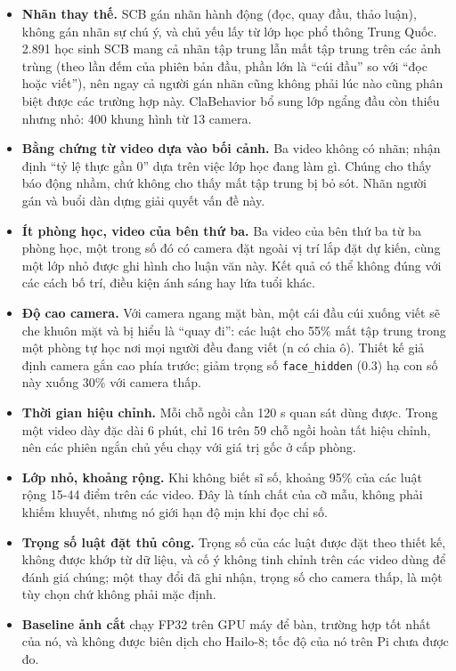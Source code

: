 \begin{itemize}
\tightlist
\item
  \textbf{Nhãn thay thế.} SCB gán nhãn hành động (đọc, quay đầu, thảo luận), không gán nhãn sự chú ý, và chủ yếu lấy từ lớp học phổ thông Trung Quốc. 2.891 học sinh SCB mang cả nhãn tập trung lẫn mất tập trung trên các ảnh trùng (theo lần đếm của phiên bản đầu, phần lớn là ``cúi đầu'' so với ``đọc hoặc viết''), nên ngay cả người gán nhãn cũng không phải lúc nào cũng phân biệt được các trường hợp này. ClaBehavior bổ sung lớp ngẩng đầu còn thiếu nhưng nhỏ: 400 khung hình từ 13 camera.
\item
  \textbf{Bằng chứng từ video dựa vào bối cảnh.} Ba video không có nhãn; nhận định ``tỷ lệ thực gần 0'' dựa trên việc lớp học đang làm gì. Chúng cho thấy báo động nhầm, chứ không cho thấy mất tập trung bị bỏ sót. Nhãn người gán và buổi dàn dựng giải quyết vấn đề này.
\item
  \textbf{Ít phòng học, video của bên thứ ba.} Ba video của bên thứ ba từ ba phòng học, một trong số đó có camera đặt ngoài vị trí lắp đặt dự kiến, cùng một lớp nhỏ được ghi hình cho luận văn này. Kết quả có thể không đúng với các cách bố trí, điều kiện ánh sáng hay lứa tuổi khác.
\item
  \textbf{Độ cao camera.} Với camera ngang mặt bàn, một cái đầu cúi xuống viết sẽ che khuôn mặt và bị hiểu là ``quay đi'': các luật cho 55\% mất tập trung trong một phòng tự học nơi mọi người đều đang viết (n có chia ô). Thiết kế giả định camera gắn cao phía trước; giảm trọng số \texttt{face\_hidden} (0.3) hạ con số này xuống 30\% với camera thấp.
\item
  \textbf{Thời gian hiệu chỉnh.} Mỗi chỗ ngồi cần 120 s quan sát dùng được. Trong một video dày đặc dài 6 phút, chỉ 16 trên 59 chỗ ngồi hoàn tất hiệu chỉnh, nên các phiên ngắn chủ yếu chạy với giá trị gốc ở cấp phòng.
\item
  \textbf{Lớp nhỏ, khoảng rộng.} Khi không biết sĩ số, khoảng 95\% của các luật rộng 15-44 điểm trên các video. Đây là tính chất của cỡ mẫu, không phải khiếm khuyết, nhưng nó giới hạn độ mịn khi đọc chỉ số.
\item
  \textbf{Trọng số luật đặt thủ công.} Trọng số của các luật được đặt theo thiết kế, không được khớp từ dữ liệu, và cố ý không tinh chỉnh trên các video dùng để đánh giá chúng; một thay đổi đã ghi nhận, trọng số cho camera thấp, là một tùy chọn chứ không phải mặc định.
\item
  \textbf{Baseline ảnh cắt} chạy FP32 trên GPU máy để bàn, trường hợp tốt nhất của nó, và không được biên dịch cho Hailo-8; tốc độ của nó trên Pi chưa được đo.

\end{itemize}
